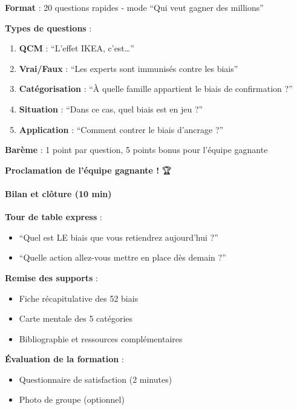 \documentclass[
]{article}
\providecommand{\tightlist}{%
  \setlength{\itemsep}{0pt}\setlength{\parskip}{0pt}}
\begin{document}
\textbf{Format} : 20 questions rapides - mode ``Qui veut gagner des
millions''

\textbf{Types de questions} :

\begin{enumerate}
\def\labelenumi{\arabic{enumi}.}
\tightlist
\item
  \textbf{QCM} : ``L'effet IKEA, c'est\ldots{}''
\item
  \textbf{Vrai/Faux} : ``Les experts sont immunisés contre les biais''
\item
  \textbf{Catégorisation} : ``À quelle famille appartient le biais de
  confirmation ?''
\item
  \textbf{Situation} : ``Dans ce cas, quel biais est en jeu ?''
\item
  \textbf{Application} : ``Comment contrer le biais d'ancrage ?''
\end{enumerate}

\textbf{Barème} : 1 point par question, 5 points bonus pour l'équipe
gagnante

\textbf{Proclamation de l'équipe gagnante !} 🏆

\paragraph{Bilan et clôture (10 min)}\label{bilan-et-cluxf4ture-10-min}

\textbf{Tour de table express} :

\begin{itemize}
\tightlist
\item
  ``Quel est LE biais que vous retiendrez aujourd'hui ?''
\item
  ``Quelle action allez-vous mettre en place dès demain ?''
\end{itemize}

\textbf{Remise des supports} :

\begin{itemize}
\tightlist
\item
  Fiche récapitulative des 52 biais
\item
  Carte mentale des 5 catégories
\item
  Bibliographie et ressources complémentaires
\end{itemize}

\textbf{Évaluation de la formation} :

\begin{itemize}
\tightlist
\item
  Questionnaire de satisfaction (2 minutes)
\item
  Photo de groupe (optionnel)
\end{itemize}
\end{document}
